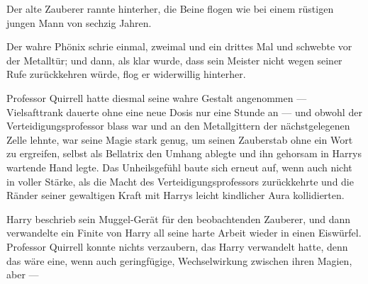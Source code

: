 Der alte Zauberer rannte hinterher, die Beine flogen wie bei einem rüstigen jungen Mann von sechzig Jahren.

Der wahre Phönix schrie einmal, zweimal und ein drittes Mal und schwebte vor der Metalltür; und dann, als klar wurde, dass sein Meister nicht wegen seiner Rufe zurückkehren würde, flog er widerwillig hinterher.

\later

Professor Quirrell hatte diesmal seine wahre Gestalt angenommen — Vielsafttrank dauerte ohne eine neue Dosis nur eine Stunde an — und obwohl der Verteidigungsprofessor blass war und an den Metallgittern der nächstgelegenen Zelle lehnte, war seine Magie stark genug, um seinen Zauberstab ohne ein Wort zu ergreifen, selbst als Bellatrix den Umhang ablegte und ihn gehorsam in Harrys wartende Hand legte. Das Unheilsgefühl baute sich erneut auf, wenn auch nicht in voller Stärke, als die Macht des Verteidigungsprofessors zurückkehrte und die Ränder seiner gewaltigen Kraft mit Harrys leicht kindlicher Aura kollidierten.

Harry beschrieb sein Muggel-Gerät für den beobachtenden Zauberer, und dann verwandelte ein Finite von Harry all seine harte Arbeit wieder in einen Eiswürfel. Professor Quirrell konnte nichts verzaubern, das Harry verwandelt hatte, denn das wäre eine, wenn auch geringfügige, Wechselwirkung zwischen ihren Magien, aber —

